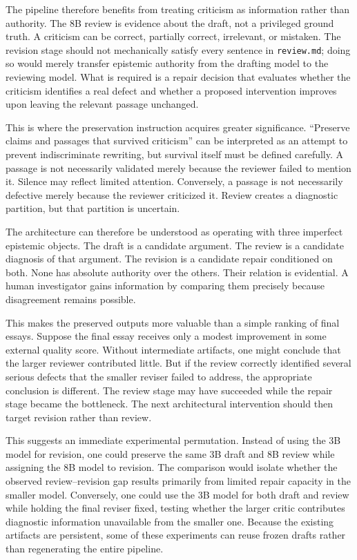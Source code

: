 \documentclass[11pt]{article}
\begin{document}
The pipeline therefore benefits from treating criticism as information rather than authority. The 8B review is evidence about the draft, not a privileged ground truth. A criticism can be correct, partially correct, irrelevant, or mistaken. The revision stage should not mechanically satisfy every sentence in \texttt{review.md}; doing so would merely transfer epistemic authority from the drafting model to the reviewing model. What is required is a repair decision that evaluates whether the criticism identifies a real defect and whether a proposed intervention improves upon leaving the relevant passage unchanged.

This is where the preservation instruction acquires greater significance. ``Preserve claims and passages that survived criticism'' can be interpreted as an attempt to prevent indiscriminate rewriting, but survival itself must be defined carefully. A passage is not necessarily validated merely because the reviewer failed to mention it. Silence may reflect limited attention. Conversely, a passage is not necessarily defective merely because the reviewer criticized it. Review creates a diagnostic partition, but that partition is uncertain.

The architecture can therefore be understood as operating with three imperfect epistemic objects. The draft is a candidate argument. The review is a candidate diagnosis of that argument. The revision is a candidate repair conditioned on both. None has absolute authority over the others. Their relation is evidential. A human investigator gains information by comparing them precisely because disagreement remains possible.

This makes the preserved outputs more valuable than a simple ranking of final essays. Suppose the final essay receives only a modest improvement in some external quality score. Without intermediate artifacts, one might conclude that the larger reviewer contributed little. But if the review correctly identified several serious defects that the smaller reviser failed to address, the appropriate conclusion is different. The review stage may have succeeded while the repair stage became the bottleneck. The next architectural intervention should then target revision rather than review.

This suggests an immediate experimental permutation. Instead of using the 3B model for revision, one could preserve the same 3B draft and 8B review while assigning the 8B model to revision. The comparison would isolate whether the observed review--revision gap results primarily from limited repair capacity in the smaller model. Conversely, one could use the 3B model for both draft and review while holding the final reviser fixed, testing whether the larger critic contributes diagnostic information unavailable from the smaller one. Because the existing artifacts are persistent, some of these experiments can reuse frozen drafts rather than regenerating the entire pipeline.
\end{document}
